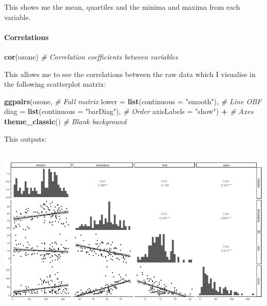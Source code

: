 \documentclass[
]{article}
\newenvironment{Shaded}{\begin{snugshade}}{\end{snugshade}}
\newcommand{\AttributeTok}[1]{\textcolor[rgb]{0.13,0.29,0.53}{#1}}
\newcommand{\CommentTok}[1]{\textcolor[rgb]{0.56,0.35,0.01}{\textit{#1}}}
\newcommand{\FunctionTok}[1]{\textcolor[rgb]{0.13,0.29,0.53}{\textbf{#1}}}
\newcommand{\NormalTok}[1]{#1}
\newcommand{\SpecialCharTok}[1]{\textcolor[rgb]{0.81,0.36,0.00}{\textbf{#1}}}
\newcommand{\StringTok}[1]{\textcolor[rgb]{0.31,0.60,0.02}{#1}}
\begin{document}
This shows me the mean, quartiles and the minima and maxima from each
variable.

\paragraph{Correlations}\label{correlations}

\begin{Shaded}
\begin{Highlighting}[]
\FunctionTok{cor}\NormalTok{(ozone)  }\CommentTok{\# Correlation coefficients between variables}
\end{Highlighting}
\end{Shaded}

This allows me to see the correlations between the raw data which I
visualise in the following scatterplot matrix:

\begin{Shaded}
\begin{Highlighting}[]
\FunctionTok{ggpairs}\NormalTok{(ozone,  }\CommentTok{\# Full matrix}
        \AttributeTok{lower =} \FunctionTok{list}\NormalTok{(}\AttributeTok{continuous =} \StringTok{"smooth"}\NormalTok{),  }\CommentTok{\# Line OBF}
        \AttributeTok{diag =} \FunctionTok{list}\NormalTok{(}\AttributeTok{continuous =} \StringTok{"barDiag"}\NormalTok{),  }\CommentTok{\# Order}
        \AttributeTok{axisLabels =} \StringTok{"show"}\NormalTok{) }\SpecialCharTok{+}  \CommentTok{\# Axes}
  \FunctionTok{theme\_classic}\NormalTok{()  }\CommentTok{\# Blank background}
\end{Highlighting}
\end{Shaded}

This outputs:\\
\strut \\
\includegraphics{images/scatter_matrix.png}\\
\strut \\
\end{document}
